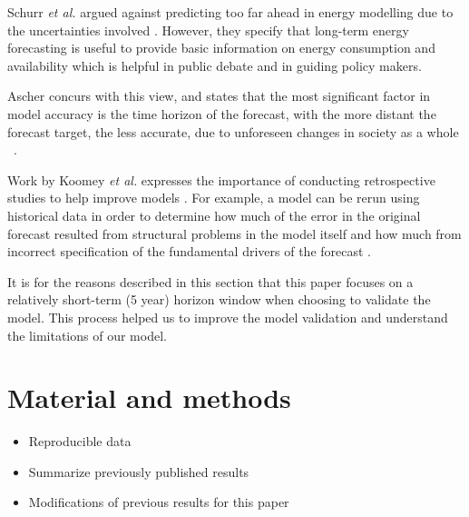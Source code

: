 \documentclass[final,3p,times,twocolumn,numbers]{elsarticle}
\begin{document}
Schurr \textit{et al.} argued against predicting too far ahead in energy modelling due to the uncertainties involved \cite{Schurr_1961}. However, they specify that long-term energy forecasting is useful to provide basic information on energy consumption and availability which is helpful in public debate and in guiding policy makers.


Ascher concurs with this view, and states that the most significant factor in model accuracy is the time horizon of the forecast, with the more distant the forecast target, the less accurate, due to unforeseen changes in society as a whole ~\cite{gillespie_1979}.

Work by Koomey \textit{et al.} expresses the importance of conducting retrospective studies to help improve models \cite{Koomey2003}. For example, a model can be rerun using historical data in order to determine how much of the error in the original forecast resulted from structural problems in the model itself and how much from incorrect specification of the fundamental drivers of the forecast \cite{Koomey2003}.


It is for the reasons described in this section that this paper focuses on a relatively short-term (5 year) horizon window when choosing to validate the model. This process helped us to improve the model validation and understand the limitations of our model.





\section{Material and methods}
\label{sec:methods}
\begin{itemize}
	\item Reproducible data
	\item Summarize previously published results
	\item Modifications of previous results for this paper
\end{itemize}
\end{document}
